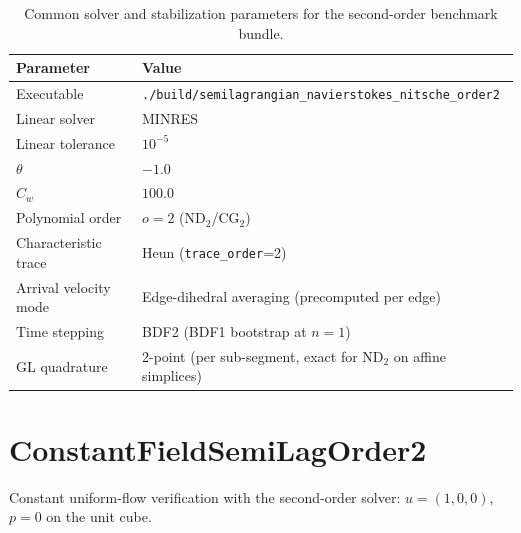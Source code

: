 \documentclass[11pt]{article}
\begin{document}
\begin{table}[H]
	\centering
	\begin{tabularx}{\textwidth}{@{}lX@{}}
		\toprule
		Parameter             & Value                                                                                 \\
		\midrule
		Executable            & \texttt{./build/semilagrangian\_navierstokes\_nitsche\_order2}                         \\
		Linear solver         & MINRES                                                                                \\
		Linear tolerance      & $10^{-5}$                                                                             \\
		$\theta$              & $-1.0$                                                                                \\
		$C_w$                 & $100.0$                                                                               \\
		Polynomial order      & $o=2$ (ND$_2$/CG$_2$)                                                                \\
		Characteristic trace  & Heun (\texttt{trace\_order}=2)                                                        \\
		Arrival velocity mode & Edge-dihedral averaging (precomputed per edge)                                        \\
		Time stepping         & BDF2 (BDF1 bootstrap at $n=1$)                                                        \\
		GL quadrature         & 2-point (per sub-segment, exact for ND$_2$ on affine simplices)                       \\
		\bottomrule
	\end{tabularx}
	\caption{Common solver and stabilization parameters for the second-order benchmark bundle.}
\end{table}


\clearpage
\section{ConstantFieldSemiLagOrder2}

Constant uniform-flow verification with the second-order solver:
$u=(1,0,0)$, $p=0$ on the unit cube.
\end{document}
